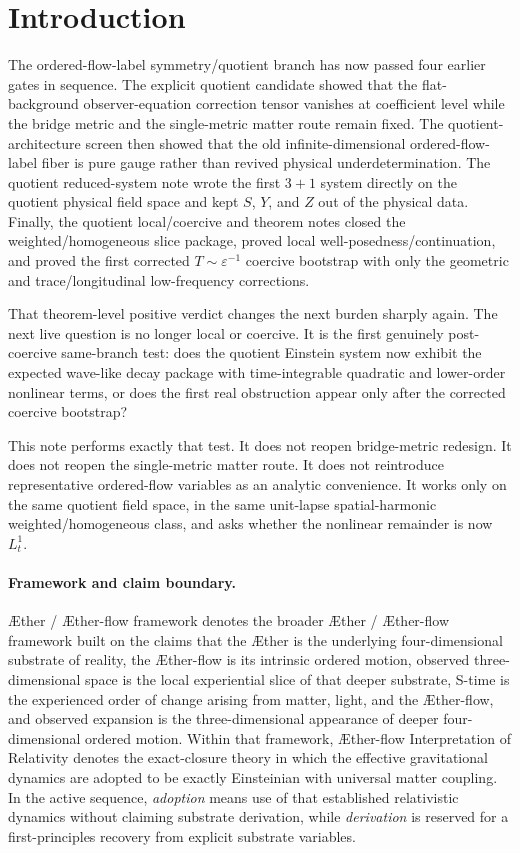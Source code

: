 \documentclass[11pt]{article}
\newcommand{\Aether}{\AE{}ther}
\newcommand{\Aflow}{\AE{}ther-flow}
\newcommand{\TheoryName}{\Aflow{} Interpretation of Relativity}
\newcommand{\TheoryProgram}{\Aether{} / \Aflow{} framework}
\begin{document}
\section{Introduction}

The ordered-flow-label symmetry/quotient branch has now passed four earlier gates in sequence. The explicit quotient candidate showed that the flat-background observer-equation correction tensor vanishes at coefficient level while the bridge metric and the single-metric matter route remain fixed. The quotient-architecture screen then showed that the old infinite-dimensional ordered-flow-label fiber is pure gauge rather than revived physical underdetermination. The quotient reduced-system note wrote the first \(3+1\) system directly on the quotient physical field space and kept \(S\), \(Y\), and \(Z\) out of the physical data. Finally, the quotient local/coercive and theorem notes closed the weighted/homogeneous slice package, proved local well-posedness/continuation, and proved the first corrected \(T\sim\varepsilon^{-1}\) coercive bootstrap with only the geometric and trace/longitudinal low-frequency corrections.

That theorem-level positive verdict changes the next burden sharply again. The next live question is no longer local or coercive. It is the first genuinely post-coercive same-branch test: does the quotient Einstein system now exhibit the expected wave-like decay package with time-integrable quadratic and lower-order nonlinear terms, or does the first real obstruction appear only after the corrected coercive bootstrap?

This note performs exactly that test. It does not reopen bridge-metric redesign. It does not reopen the single-metric matter route. It does not reintroduce representative ordered-flow variables as an analytic convenience. It works only on the same quotient field space, in the same unit-lapse spatial-harmonic weighted/homogeneous class, and asks whether the nonlinear remainder is now \(L_t^1\).

\paragraph{Framework and claim boundary.}
\TheoryProgram{} denotes the broader \Aether{} / \Aflow{} framework built on the claims that the \Aether{} is the underlying four-dimensional substrate of reality, the \Aflow{} is its intrinsic ordered motion, observed three-dimensional space is the local experiential slice of that deeper substrate, S-time is the experienced order of change arising from matter, light, and the \Aflow{}, and observed expansion is the three-dimensional appearance of deeper four-dimensional ordered motion. Within that framework, \TheoryName{} denotes the exact-closure theory in which the effective gravitational dynamics are adopted to be exactly Einsteinian with universal matter coupling. In the active sequence, \emph{adoption} means use of that established relativistic dynamics without claiming substrate derivation, while \emph{derivation} is reserved for a first-principles recovery from explicit substrate variables.
\end{document}

